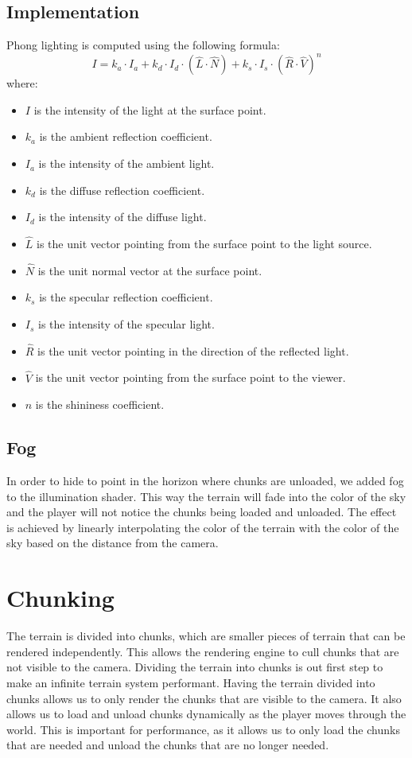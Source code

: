 \documentclass{article}
\begin{document}
\subsection{Implementation}
Phong lighting is computed using the following formula: $$ I = k_a \cdot I_a + k_d \cdot I_d \cdot
	(\hat{L} \cdot \hat{N}) + k_s \cdot I_s \cdot (\hat{R} \cdot \hat{V})^n $$ where:
\begin{itemize}
	\item $I$ is the intensity of the light at the surface point.
	\item $k_a$ is the ambient reflection coefficient.
	\item $I_a$ is the intensity of the ambient light.
	\item $k_d$ is the diffuse reflection coefficient.
	\item $I_d$ is the intensity of the diffuse light.
	\item $\hat{L}$ is the unit vector pointing from the surface point to the light source.
	\item $\hat{N}$ is the unit normal vector at the surface point.
	\item $k_s$ is the specular reflection coefficient.
	\item $I_s$ is the intensity of the specular light.
	\item $\hat{R}$ is the unit vector pointing in the direction of the reflected light.
	\item $\hat{V}$ is the unit vector pointing from the surface point to the viewer.
	\item $n$ is the shininess coefficient.
\end{itemize}

\subsection{Fog}
In order to hide to point in the horizon where chunks are unloaded, we added fog to the
illumination shader. This way the terrain will fade into the color of the sky and the player will
not notice the chunks being loaded and unloaded. The effect is achieved by linearly interpolating
the color of the terrain with the color of the sky based on the distance from the camera.

\section{Chunking}
The terrain is divided into chunks, which are smaller pieces of terrain that can be rendered
independently. This allows the rendering engine to cull chunks that are not visible to the camera.
Dividing the terrain into chunks is out first step to make an infinite terrain system performant.
Having the terrain divided into chunks allows us to only render the chunks that are visible to the
camera. It also allows us to load and unload chunks dynamically as the player moves through the
world. This is important for performance, as it allows us to only load the chunks that are needed
and unload the chunks that are no longer needed.
\end{document}
